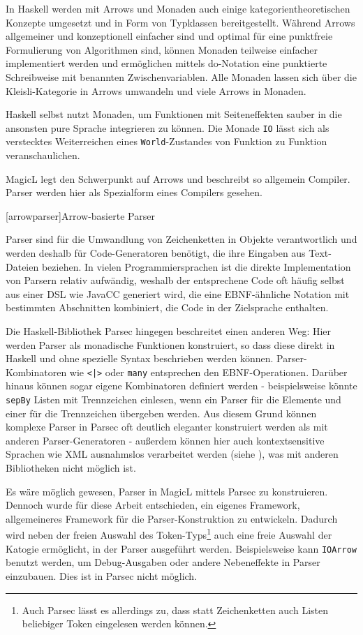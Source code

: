 \documentclass[11pt, a4paper, bibgerm]{scrbook}
\newcommand\icode[1]{\lstinline?#1?}
\newcommand\lchapter{}
\begin{document}
In Haskell werden mit Arrows und Monaden auch einige
kategorientheoretischen Konzepte umgesetzt und in Form von Typklassen
bereitgestellt. Während Arrows allgemeiner und konzeptionell einfacher
sind und optimal für eine punktfreie Formulierung von Algorithmen sind,
können Monaden teilweise einfacher implementiert werden und ermöglichen
mittels do-Notation eine punktierte Schreibweise mit benannten
Zwischenvariablen. Alle Monaden lassen sich über die Kleisli-Kategorie
in Arrows umwandeln und viele Arrows in Monaden.

Haskell selbst nutzt Monaden, um Funktionen mit Seiteneffekten sauber in
die ansonsten pure Sprache integrieren zu können. Die Monade \icode{IO}
lässt sich als verstecktes Weiterreichen eines \icode{World}-Zustandes von
Funktion zu Funktion veranschaulichen.

MagicL legt den Schwerpunkt auf Arrows und beschreibt so allgemein
Compiler. Parser werden hier als Spezialform eines Compilers gesehen.

\lchapter[arrowparser]{Arrow-basierte Parser}

Parser sind für die Umwandlung von Zeichenketten in Objekte
verantwortlich und werden deshalb für Code-Generatoren benötigt, die
ihre Eingaben aus Text-Dateien beziehen. In vielen Programmiersprachen
ist die direkte Implementation von Parsern relativ aufwändig, weshalb
der entsprechene Code oft häufig selbst aus einer DSL wie JavaCC
generiert wird, die eine EBNF-ähnliche Notation mit bestimmten
Abschnitten kombiniert, die Code in der Zielsprache enthalten.

Die Haskell-Bibliothek Parsec\cite{Parsec} hingegen beschreitet einen
anderen Weg: Hier werden Parser als monadische Funktionen konstruiert,
so dass diese direkt in Haskell und ohne spezielle Syntax beschrieben
werden können. Parser-Kombinatoren wie \icode{<|>} oder \icode{many}
entsprechen den EBNF-Operationen. Darüber hinaus können sogar eigene
Kombinatoren definiert werden - beispielsweise könnte \icode{sepBy}
Listen mit Trennzeichen einlesen, wenn ein Parser für die Elemente und
einer für die Trennzeichen übergeben werden. Aus diesem Grund können
komplexe Parser in Parsec oft deutlich eleganter konstruiert werden als
mit anderen Parser-Generatoren - außerdem können hier auch
kontextsensitive Sprachen wie XML ausnahmslos verarbeitet werden (siehe
\cite[S. 3]{Parsec}), was mit anderen Bibliotheken nicht möglich ist.

Es wäre möglich gewesen, Parser in MagicL mittels Parsec zu
konstruieren. Dennoch wurde für diese Arbeit entschieden, ein eigenes
Framework, allgemeineres Framework für die Parser-Konstruktion zu
entwickeln. Dadurch wird neben der freien Auswahl des
Token-Typs\footnote{Auch Parsec lässt es allerdings zu, dass statt
  Zeichenketten auch Listen beliebiger Token eingelesen werden können.}
auch eine freie Auswahl der Katogie ermöglicht, in der Parser ausgeführt
werden.  Beispielsweise kann \icode{IOArrow} benutzt werden, um
Debug-Ausgaben oder andere Nebeneffekte in Parser einzubauen. Dies ist
in Parsec nicht möglich.
\end{document}
